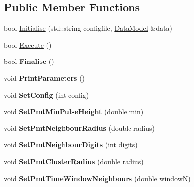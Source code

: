 \subsection*{Public Member Functions}
\begin{DoxyCompactItemize}
\item 
bool \hyperlink{classHitCleaner_a35bd6ca1401c52439166e51c7e873ace}{Initialise} (std\-::string configfile, \hyperlink{classDataModel}{Data\-Model} \&data)
\item 
bool \hyperlink{classHitCleaner_adec5b94400dcbfc710590d7eb387041b}{Execute} ()
\item 
\hypertarget{classHitCleaner_a06d16e3d574ec685952c011d2309fa76}{bool {\bfseries Finalise} ()}\label{classHitCleaner_a06d16e3d574ec685952c011d2309fa76}

\item 
\hypertarget{classHitCleaner_a2d7f24be0dae3a9aa53771bc0bdb65c6}{void {\bfseries Print\-Parameters} ()}\label{classHitCleaner_a2d7f24be0dae3a9aa53771bc0bdb65c6}

\item 
\hypertarget{classHitCleaner_af75191aadcf2acffcc1c13549d062fc8}{void {\bfseries Set\-Config} (int config)}\label{classHitCleaner_af75191aadcf2acffcc1c13549d062fc8}

\item 
\hypertarget{classHitCleaner_acb667165fb7166a54b5401264c76cf60}{void {\bfseries Set\-Pmt\-Min\-Pulse\-Height} (double min)}\label{classHitCleaner_acb667165fb7166a54b5401264c76cf60}

\item 
\hypertarget{classHitCleaner_a48ecb1833030a1e53d76f852735b1146}{void {\bfseries Set\-Pmt\-Neighbour\-Radius} (double radius)}\label{classHitCleaner_a48ecb1833030a1e53d76f852735b1146}

\item 
\hypertarget{classHitCleaner_a05aaf25ef5464e2cc0cbb67a123a4683}{void {\bfseries Set\-Pmt\-Neighbour\-Digits} (int digits)}\label{classHitCleaner_a05aaf25ef5464e2cc0cbb67a123a4683}

\item 
\hypertarget{classHitCleaner_a374f2c25fd741ba89253c1df57c2f711}{void {\bfseries Set\-Pmt\-Cluster\-Radius} (double radius)}\label{classHitCleaner_a374f2c25fd741ba89253c1df57c2f711}

\item 
\hypertarget{classHitCleaner_a2034dc5fabc9bd6a7f06bfe9be9172f4}{void {\bfseries Set\-Pmt\-Time\-Window\-Neighbours} (double window\-N)}\label{classHitCleaner_a2034dc5fabc9bd6a7f06bfe9be9172f4}


\end{DoxyCompactItemize}

